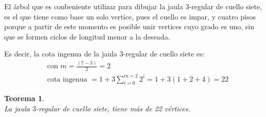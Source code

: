 \documentclass[12pt]{book}
\newtheorem{theorem}{Teorema}
\theoremstyle{definition}
\begin{document}


El árbol que es conbeniente utilizar para dibujar la jaula $3$-regular
de cuello siete, es el que tiene como base un solo vertice, pues el
cuello es impar, y cuatro pisos porque a partir de este momento es
posible unir vertices cuyo grado es uno, sin que se formen ciclos de
longitud menor a la deseada.

Es decir, la cota ingenua de la jaula 3-regular de cuello siete es:
\begin{equation*}
\begin{split}
  &\text{ con } m=\frac{(7-3)}{2}=2\\
 &\text{ cota ingenua }=1+3\sum^{m=2}_{i=0} 2^i=1+3(1+2+4)=22
\end{split}
\end{equation*}


\begin{theorem}\textbf{}\\
\label{Noexiste(3,7)de22}
La jaula $3$-regular de cuello siete, tiene más de 22 vértices.
\end{theorem}
\end{document}
